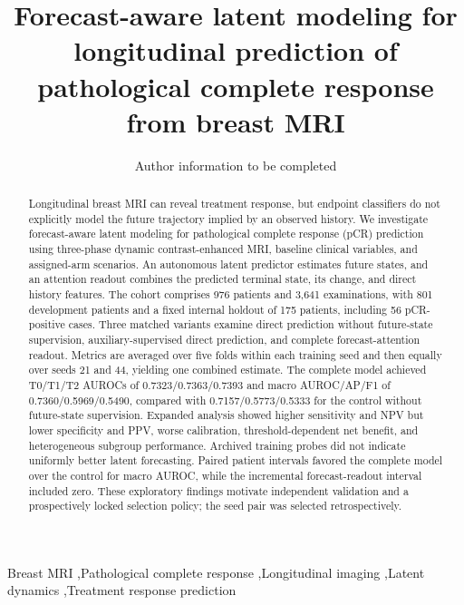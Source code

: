 \documentclass[5p,twocolumn,authoryear]{elsarticle}
\begin{document}
\begin{frontmatter}
\title{Forecast-aware latent modeling for longitudinal prediction of pathological complete response from breast MRI}
\author{Author information to be completed}
\address{Affiliations and corresponding author to be completed}
\begin{abstract}
Longitudinal breast MRI can reveal treatment response, but endpoint classifiers do not explicitly model the future trajectory implied by an observed history. We investigate forecast-aware latent modeling for pathological complete response (pCR) prediction using three-phase dynamic contrast-enhanced MRI, baseline clinical variables, and assigned-arm scenarios. An autonomous latent predictor estimates future states, and an attention readout combines the predicted terminal state, its change, and direct history features. The cohort comprises 976 patients and 3,641 examinations, with 801 development patients and a fixed internal holdout of 175 patients, including 56 pCR-positive cases. Three matched variants examine direct prediction without future-state supervision, auxiliary-supervised direct prediction, and complete forecast-attention readout. Metrics are averaged over five folds within each training seed and then equally over seeds 21 and 44, yielding one combined estimate. The complete model achieved T0/T1/T2 AUROCs of 0.7323/0.7363/0.7393 and macro AUROC/AP/F1 of 0.7360/0.5969/0.5490, compared with 0.7157/0.5773/0.5333 for the control without future-state supervision. Expanded analysis showed higher sensitivity and NPV but lower specificity and PPV, worse calibration, threshold-dependent net benefit, and heterogeneous subgroup performance. Archived training probes did not indicate uniformly better latent forecasting. Paired patient intervals favored the complete model over the control for macro AUROC, while the incremental forecast-readout interval included zero. These exploratory findings motivate independent validation and a prospectively locked selection policy; the seed pair was selected retrospectively.
\end{abstract}
\begin{keyword}
Breast MRI \sep Pathological complete response \sep Longitudinal imaging \sep Latent dynamics \sep Treatment response prediction
\end{keyword}
\end{frontmatter}








\end{document}
